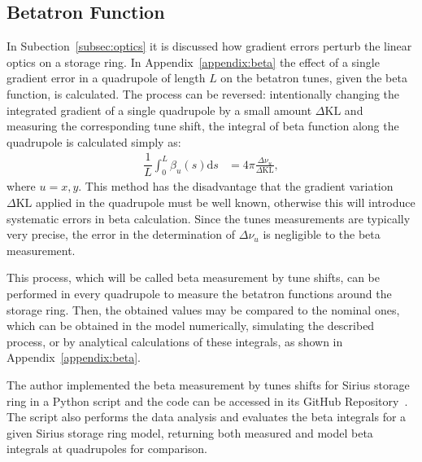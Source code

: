 \subsection{Betatron Function}
In Subection~\ref{subsec:optics} it is discussed how gradient errors perturb the linear optics on a storage ring. In Appendix~\ref{appendix:beta} the effect of a single gradient error in a quadrupole of length $L$ on the betatron tunes, given the beta function, is calculated. The process can be reversed: intentionally changing the integrated gradient of a single quadrupole by a small amount $\Delta \mathrm{KL}$ and measuring the corresponding tune shift, the integral of beta function along the quadrupole is calculated simply as:
\begin{align}
\dfrac{1}{L}\int_{0}^{L} \beta_u(s) \mathrm{d}s &= 4\pi\frac{\Delta \nu_u}{\Delta \mathrm{KL}},
\end{align}
where $u=x, y$. This method has the disadvantage that the gradient variation $\Delta \mathrm{KL}$ applied in the quadrupole must be well known, otherwise this will introduce systematic errors in beta calculation. Since the tunes measurements are typically very precise, the error in the determination of $\Delta \nu_u$ is negligible to the beta measurement.

This process, which will be called beta measurement by tune shifts, can be performed in every quadrupole to measure the betatron functions around the storage ring. Then, the obtained values may be compared to the nominal ones, which can be obtained in the model numerically, simulating the described process, or by analytical calculations of these integrals, as shown in Appendix~\ref{appendix:beta}.

The author implemented the beta measurement by tunes shifts for Sirius storage ring in a Python script and the code can be accessed in its GitHub Repository~\cite{betasirius}. The script also performs the data analysis and evaluates the beta integrals for a given Sirius storage ring model, returning both measured and model beta integrals at quadrupoles for comparison.

